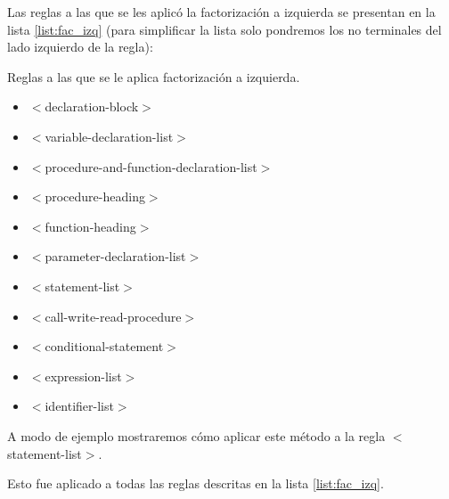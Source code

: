 Las reglas a las que se les aplicó la factorización a izquierda se presentan en la lista \ref{list:fac_izq} (para simplificar la lista solo pondremos los no terminales del lado izquierdo de la regla):
\begin{mylist}[H]
\caption{Reglas a las que se le aplica factorización a izquierda.}
\begin{multicols}{3}
\begin{itemize}
\item $<$declaration-block$>$
\item $<$variable-declaration-list$>$
\item $<$procedure-and-function-declaration-list$>$
\item $<$procedure-heading$>$ 
\item $<$function-heading$>$
\item $<$parameter-declaration-list$>$
\item $<$statement-list$>$
\item $<$call-write-read-procedure$>$
\item $<$conditional-statement$>$
\item $<$expression-list$>$
\item $<$identifier-list$>$
\end{itemize}
\end{multicols}
\label{list:fac_izq}
\end{mylist}

A modo de ejemplo mostraremos cómo aplicar este método a la regla  $<$statement-list$>$.

\begin{center}
\end{center}

Esto fue aplicado a todas las reglas descritas en la lista \ref{list:fac_izq}.

